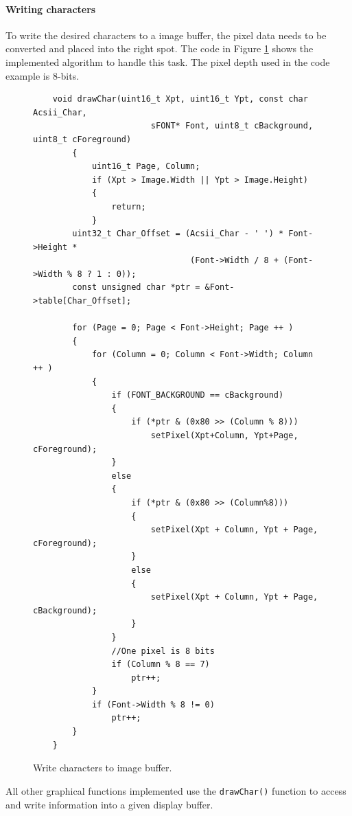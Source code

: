 \paragraph{Writing characters}
To write the desired characters to a image buffer, the pixel data needs to be converted and placed into the right spot. 
The code in Figure \ref{software:drawchar} shows the implemented algorithm to handle this task.
The pixel depth used in the code example is 8-bits. 
\begin{figure}[ht]
	\begin{lstlisting}
	void drawChar(uint16_t Xpt, uint16_t Ypt, const char Acsii_Char,
						sFONT* Font, uint8_t cBackground, uint8_t cForeground)
		{
			uint16_t Page, Column;
			if (Xpt > Image.Width || Ypt > Image.Height) 
			{
				return;
			}
		uint32_t Char_Offset = (Acsii_Char - ' ') * Font->Height * 
								(Font->Width / 8 + (Font->Width % 8 ? 1 : 0));
		const unsigned char *ptr = &Font->table[Char_Offset];
		
		for (Page = 0; Page < Font->Height; Page ++ ) 
		{
			for (Column = 0; Column < Font->Width; Column ++ ) 
			{
				if (FONT_BACKGROUND == cBackground) 
				{ 
					if (*ptr & (0x80 >> (Column % 8)))
						setPixel(Xpt+Column, Ypt+Page, cForeground);
				} 
				else 
				{
					if (*ptr & (0x80 >> (Column%8))) 
					{
						setPixel(Xpt + Column, Ypt + Page, cForeground);					
					} 
					else 
					{
						setPixel(Xpt + Column, Ypt + Page, cBackground);
					}
				}
				//One pixel is 8 bits
				if (Column % 8 == 7)
					ptr++;
			}
			if (Font->Width % 8 != 0)
				ptr++;
		}
	}
	\end{lstlisting}
	\caption{Write characters to image buffer.\label{software:drawchar}}
\end{figure}

All other graphical functions implemented use the \texttt{drawChar()} function to access and write information into a given display buffer. 


%	


